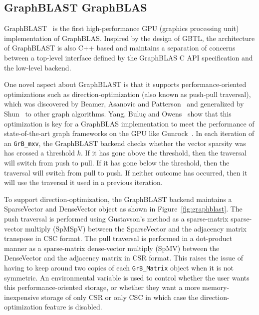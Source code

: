 \subsection{GraphBLAST GraphBLAS}


GraphBLAST~\cite{Yang:2019:GBL} is the first high-performance GPU (graphics processing unit) implementation of GraphBLAS. Inspired by the design of GBTL, the architecture of GraphBLAST is also C++ based and maintains a separation of concerns between a top-level interface defined by the GraphBLAS C API specification and the low-level backend. 

One novel aspect about GraphBLAST is that it supports performance-oriented optimizations such as direction-optimization (also known as push-pull traversal), which was discovered by Beamer, Asanovic and Patterson~\cite{Beamer:2012:DOB} and generalized by Shun~\cite{Shun:2013:Ligra} to other graph algorithms. Yang, Bulu\c{c} and Owens~\cite{Yang:2018:IPE} show that this optimization is key for a GraphBLAS implementation to meet the performance of state-of-the-art graph frameworks on the GPU like Gunrock~\cite{Wang:2017:GGG}. In each iteration of an \verb'GrB_mxv', the GraphBLAST backend checks whether the vector sparsity was has crossed a threshold $k$. If it has gone above the threshold, then the traversal will switch from push to pull. If it has gone below the threshold, then the traversal will switch from pull to push. If neither outcome has occurred, then it will use the traversal it used in a previous iteration. 

To support direction-optimization, the GraphBLAST backend maintains a SparseVector and DenseVector object as shown in Figure~\ref{fig:graphblast}. The push traversal is performed using Gustavson's method as a sparse-matrix sparse-vector multiply (SpMSpV) between the SparseVector and the adjacency matrix transpose in CSC format. The pull traversal is performed in a dot-product manner as a sparse-matrix dense-vector multiply (SpMV) between the DenseVector and the adjacency matrix in CSR format. This raises the issue of having to keep around two copies of each \verb'GrB_Matrix' object when it is not symmetric. An environmental variable is used to control whether the user wants this performance-oriented storage, or whether they want a more memory-inexpensive storage of only CSR or only CSC in which case the direction-optimization feature is disabled.


